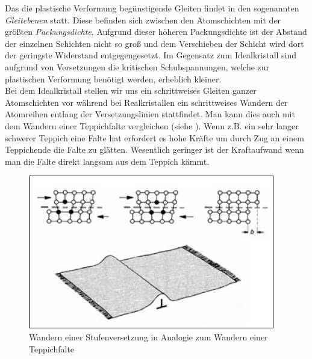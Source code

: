 \documentclass[12pt,a4paper,parskip,twoside,BCOR5mm,headsepline]{scrartcl}
\begin{document}
\begin{description*}
{Das die plastische Verformung begünstigende Gleiten findet in den sogenannten \emph{Gleitebenen} statt. Diese befinden sich zwischen den Atomschichten mit der größten \emph{Packungsdichte}. Aufgrund dieser höheren Packungsdichte ist der Abstand der einzelnen Schichten nicht so groß und dem Verschieben der Schicht wird dort der  geringste Widerstand entgegengesetzt. Im Gegensatz zum Idealkristall sind aufgrund von Versetzungen die kritischen Schubspannungen, welche zur plastischen Verformung benötigt werden,  erheblich kleiner.\\ Bei dem Idealkristall stellen wir uns ein schrittweises Gleiten ganzer Atomschichten vor während bei Realkristallen ein schrittweises Wandern der Atomreihen entlang der Versetzungslinien stattfindet. Man kann dies auch mit dem Wandern einer Teppichfalte vergleichen (siehe ). Wenn z.B. ein sehr langer schwerer Teppich eine Falte hat erfordert es hohe Kräfte um durch Zug an einem Teppichende die Falte zu glätten. Wesentlich geringer ist der Kraftaufwand wenn man die Falte direkt langsam aus dem Teppich kämmt. \autocite[45-53]{wk}
\begin{figure}
\centering
\includegraphics[width=.8\textwidth]{wandernstufenversetzung}
\caption[Wandern einer Stufenversetzung]{Wandern einer Stufenversetzung in Analogie zum Wandern einer Teppichfalte \autocite[53]{wk}}
\label{fig:wandernstufenversetzung}
\end{figure}


}
\end{description*}
\end{document}
